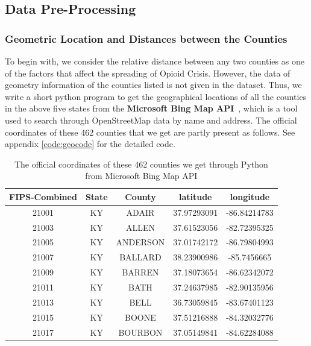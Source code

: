 \documentclass{mcmthesis}
\begin{document}
\subsection{Data Pre-Processing}

\subsubsection{Geometric Location and Distances between the Counties}

To begin with, we consider the relative distance between any two counties as one of the factors that affect the spreading of Opioid Crisis. However, the data of geometry information of the counties listed is not given in the dataset. Thus, we write a short python program to get the geographical locations of all the counties in the above five states from the \textbf{Microsoft Bing Map API}~\cite{bing}, which is a tool used to search through OpenStreetMap data by name and address. The official coordinates of these 462 counties that we get are partly present as follows. See appendix \ref{code:geocode} for the detailed code. 
    
\begin{table}[H]
    \centering
     \caption{The official coordinates of these 462 counties we get through Python from Microsoft Bing Map API}
    \label{tab:geotable}
    \begin{tabular}{|c|c|c|c|c|}
        \hline
FIPS-Combined &	State &	County &	latitude &	longitude \\ \hline
21001 &	KY &	ADAIR&	37.97293091	&-86.84214783\\
21003&	KY&	ALLEN&	37.61523056&	-82.72395325\\
21005&	KY&	ANDERSON&	37.01742172	&-86.79804993\\
21007&	KY&	BALLARD&	38.23900986	&-85.7456665\\
21009&	KY&	BARREN&	37.18073654&	-86.62342072\\
21011&	KY&	BATH&	37.24637985&	-82.90135956\\
21013&	KY& BELL&	36.73059845&   -83.67401123\\
21015&	KY&	BOONE&	37.51216888&	-84.32032776\\
21017&	KY&	BOURBON	&37.05149841&	-84.62284088\\
\hline
    \end{tabular}
\end{table}    
    
\end{document}
